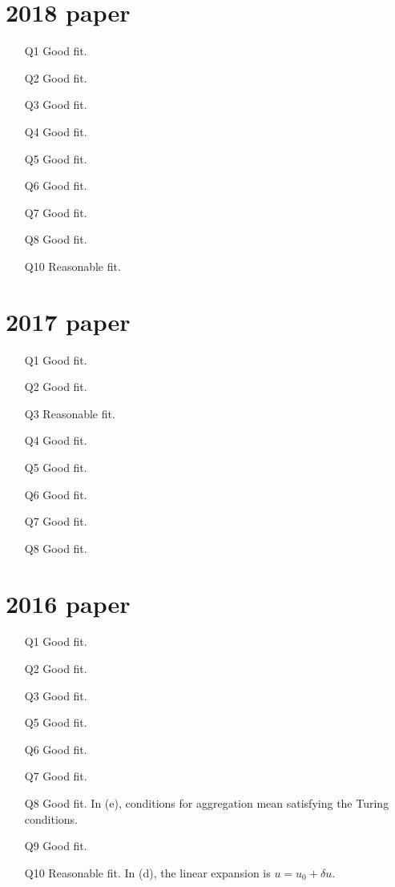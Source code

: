 \begin{multicols}{2}
\section*{2018 paper}
\begin{itemize}
\item[Q1] Good fit.
\item[Q2] Good fit.
\item[Q3] Good fit.
\item[Q4] Good fit.
\item[Q5] Good fit.
\item[Q6] Good fit.
\item[Q7] Good fit.
\item[Q8] Good fit. 
\item[Q10] Reasonable fit.
\end{itemize}

\section*{2017 paper}
\begin{itemize}
\item[Q1] Good fit.
\item[Q2] Good fit.
\item[Q3] Reasonable fit.
\item[Q4] Good fit.
\item[Q5] Good fit.
\item[Q6] Good fit.
\item[Q7] Good fit.
\item[Q8] Good fit. 
\end{itemize}

\section*{2016 paper}
\begin{itemize}
\item[Q1] Good fit.
\item[Q2] Good fit.
\item[Q3] Good fit.
\item[Q5] Good fit.
\item[Q6] Good fit.
\item[Q7] Good fit.
\item[Q8] Good fit. In (e), conditions for aggregation mean satisfying the Turing conditions.
\item[Q9] Good fit.
\item[Q10] Reasonable fit. In (d), the linear expansion is $u=u_0 + \delta u$.
\end{itemize}


\end{multicols}
